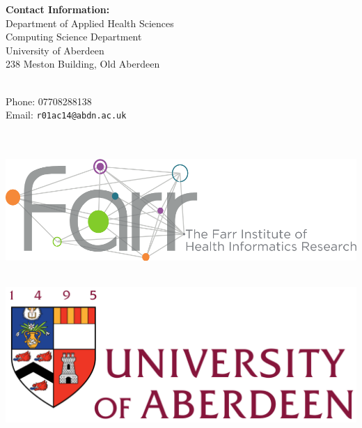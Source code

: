 \documentclass[a0,portrait]{a0poster}
\begin{document}
\vspace{2cm} %

%
\begin{minipage}[b]{0.30\linewidth}
\color{DarkSlateGray}\Large \textbf{Contact Information:}\\
Department of Applied Health Sciences\\ %
Computing Science Department \\
University of Aberdeen\\
238 Meston Building, Old Aberdeen\\
\end{minipage}
%
\begin{minipage}[b]{0.25\linewidth}
\color{DarkSlateGray}\Large \textbf{~}\\
Phone: 07708288138\\ %
Email: \texttt{r01ac14@abdn.ac.uk}\\ %
\\
\\
\end{minipage}
% 
\begin{minipage}[b]{0.21\linewidth}
\includegraphics[width=15cm]{logo-farr2.png} 
\\\\
\end{minipage}
% 
\begin{minipage}[b]{0.19\linewidth}
\includegraphics[width=15cm]{logo.png} %
\\\\
\end{minipage}
\end{document}
